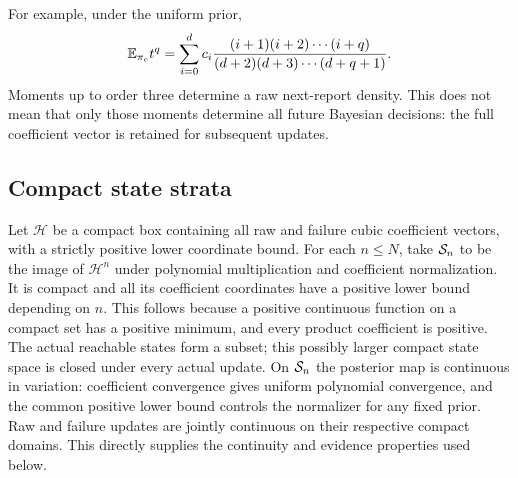 For example, under the uniform prior,
\[
 \mathbb E_{\pi_c}t^q=\sum_{i=0}^d c_i
 \frac{(i+1)(i+2)\cdots(i+q)}{(d+2)(d+3)\cdots(d+q+1)}.
\]
Moments up to order three determine a raw next-report density. This does
not mean that only those moments determine all future Bayesian decisions:
the full coefficient vector is retained for subsequent updates.

\subsection{Compact state strata}
Let $\mathcal H$ be a compact box containing all raw and failure cubic
coefficient vectors, with a strictly positive lower coordinate bound.
For each $n\le N$, take $\mathcal S_n$ to be the image of $\mathcal H^n$ under
polynomial multiplication and coefficient normalization. It is compact and
all its coefficient coordinates have a positive lower bound depending on
$n$. This follows because a positive continuous function on a compact set
has a positive minimum, and every product coefficient is positive.
The actual reachable states form a subset; this possibly larger compact
state space is closed under every actual update. On $\mathcal S_n$ the posterior
map is continuous in variation: coefficient convergence gives uniform
polynomial convergence, and the common positive lower bound controls the
normalizer for any fixed prior. Raw and failure updates are jointly
continuous on their respective compact domains. This directly supplies the
continuity and evidence properties used below.

